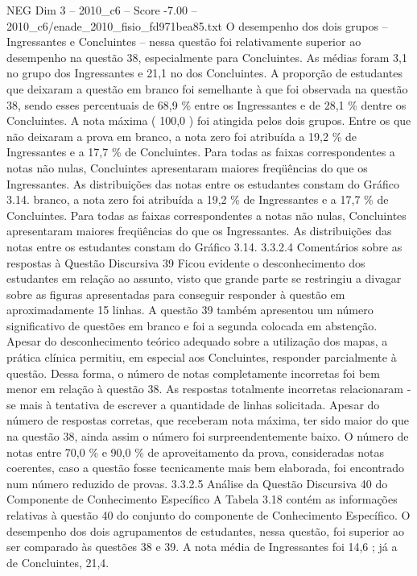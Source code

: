 \begin{textsample}{NEG Dim 3 – 2010\_c6 – Score -7.00 – 2010\_c6/enade\_2010\_fisio\_fd971bea85.txt}
O desempenho dos dois grupos – Ingressantes e Concluintes – nessa questão foi relativamente superior ao desempenho na questão 38, especialmente para Concluintes.
As médias foram 3,1 no grupo dos Ingressantes e 21,1 no dos Concluintes.
A proporção de estudantes que deixaram a questão em branco foi semelhante à que foi observada na questão 38, sendo esses percentuais de 68,9 \% entre os Ingressantes e de 28,1 \% dentre os Concluintes.
A nota máxima ( 100,0 ) foi atingida pelos dois grupos.
Entre os que não deixaram a prova em branco, a nota zero foi atribuída a 19,2 \% de Ingressantes e a 17,7 \% de Concluintes.
Para todas as faixas correspondentes a notas não nulas, Concluintes apresentaram maiores freqüências do que os Ingressantes.
As distribuições das notas entre os estudantes constam do Gráfico 3.14. branco, a nota zero foi atribuída a 19,2 \% de Ingressantes e a 17,7 \% de Concluintes.
Para todas as faixas correspondentes a notas não nulas, Concluintes apresentaram maiores freqüências do que os Ingressantes.
As distribuições das notas entre os estudantes constam do Gráfico 3.14. 3.3.2.4 Comentários sobre as respostas à Questão Discursiva 39 Ficou evidente o desconhecimento dos estudantes em relação ao assunto, visto que grande parte se restringiu a divagar sobre as figuras apresentadas para conseguir responder à questão em aproximadamente 15 linhas.
A questão 39 também apresentou um número significativo de questões em branco e foi a segunda colocada em abstenção.
Apesar do desconhecimento teórico adequado sobre a utilização dos mapas, a prática clínica permitiu, em especial aos Concluintes, responder parcialmente à questão.
Dessa forma, o número de notas completamente incorretas foi bem menor em relação à questão 38.
As respostas totalmente incorretas relacionaram -se mais à tentativa de escrever a quantidade de linhas solicitada.
Apesar do número de respostas corretas, que receberam nota máxima, ter sido maior do que na questão 38, ainda assim o número foi surpreendentemente baixo.
O número de notas entre 70,0 \% e 90,0 \% de aproveitamento da prova, consideradas notas coerentes, caso a questão fosse tecnicamente mais bem elaborada, foi encontrado num número reduzido de provas. 3.3.2.5 Análise da Questão Discursiva 40 do Componente de Conhecimento Específico A Tabela 3.18 contém as informações relativas à questão 40 do conjunto do componente de Conhecimento Específico.
O desempenho dos dois agrupamentos de estudantes, nessa questão, foi superior ao ser comparado às questões 38 e 39.
A nota média de Ingressantes foi 14,6 ; já a de Concluintes, 21,4.

\end{textsample}
